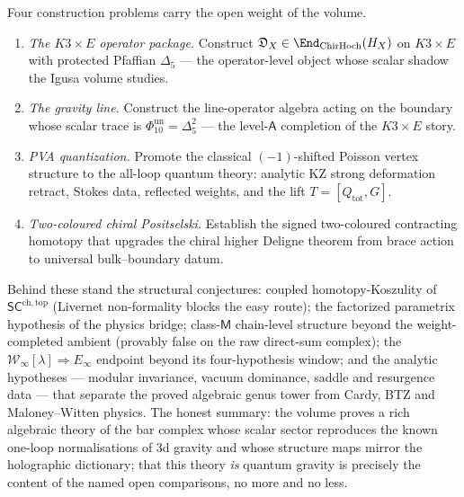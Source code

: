 \documentclass[11pt]{article}
\providecommand{\cW}{\mathcal{W}}
\providecommand{\ChirHoch}{\operatorname{ChirHoch}}
\providecommand{\SCchtop}{\mathsf{SC}^{\mathrm{ch,top}}}
\providecommand{\Dfive}{\Delta_5}
\providecommand{\Phiten}{\Phi_{10}}
\begin{document}
Four construction problems carry the open weight of the volume.

\begin{enumerate}
\item \emph{The $K3\times E$ operator package.} Construct
$\mathfrak D_X\in\End_{\ChirHoch}(H_X)$ on $K3\times E$ with protected
Pfaffian $\Dfive$ --- the operator-level object whose scalar shadow the
Igusa volume studies.
\item \emph{The gravity line.} Construct the line-operator algebra
acting on the boundary whose scalar trace is
$\Phiten^{\mathrm{un}}=\Dfive^2$ --- the level-$\mathsf A$ completion
of the $K3\times E$ story.
\item \emph{PVA quantization.} Promote the classical $(-1)$-shifted
Poisson vertex structure to the all-loop quantum theory: analytic KZ
strong deformation retract, Stokes data, reflected weights, and the
lift $T=[Q_{\mathrm{tot}},G]$.
\item \emph{Two-coloured chiral Positselski.} Establish the signed
two-coloured contracting homotopy that upgrades the chiral higher
Deligne theorem from brace action to universal bulk--boundary datum.
\end{enumerate}

Behind these stand the structural conjectures: coupled
homotopy-Koszulity of $\SCchtop$ \textup{(Livernet non-formality blocks
the easy route)}; the factorized parametrix hypothesis of the physics
bridge; class-$\mathsf M$ chain-level structure beyond the
weight-completed ambient \textup{(provably false on the raw
direct-sum complex)}; the $\cW_\infty[\lambda]\Rightarrow E_\infty$
endpoint beyond its four-hypothesis window; and the analytic
hypotheses --- modular invariance, vacuum dominance, saddle and
resurgence data --- that separate the proved algebraic genus tower
from Cardy, BTZ and Maloney--Witten physics. The honest summary: the
volume proves a rich algebraic theory of the bar complex whose scalar
sector reproduces the known one-loop normalisations of 3d gravity and
whose structure maps mirror the holographic dictionary; that this
theory \emph{is} quantum gravity is precisely the content of the named
open comparisons, no more and no less.
\end{document}
